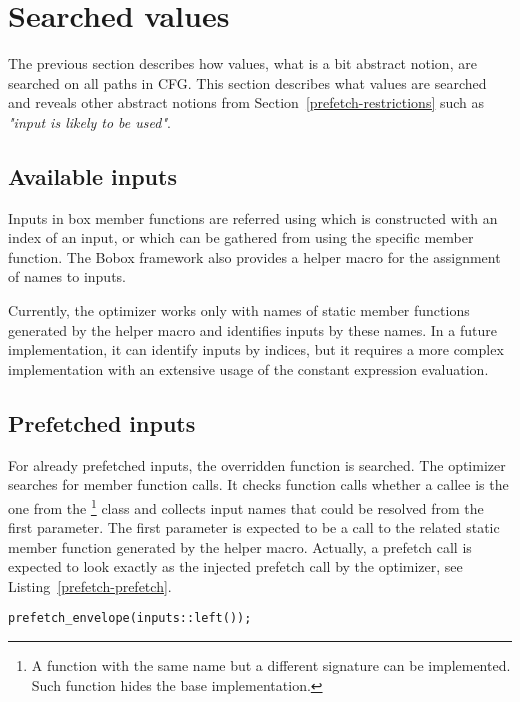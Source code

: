 \section{Searched values}
The previous section describes how values, what is a bit abstract notion, are searched on all paths in CFG. This section describes what values are searched and reveals other abstract notions from Section~\ref{prefetch-restrictions} such as \textit{"input is likely to be used"}.

\subsection{Available inputs}
Inputs in box member functions are referred using  which is constructed with an index of an input, or  which can be gathered from  using the specific  member function. The Bobox framework also provides a helper macro for the assignment of names to inputs.

Currently, the optimizer works only with names of static member functions generated by the helper macro and identifies inputs by these names. In a future implementation, it can identify inputs by indices, but it requires a more complex implementation with an extensive usage of the constant expression evaluation.

\subsection{Prefetched inputs}
For already prefetched inputs, the overridden  function is searched. The optimizer searches for  member function calls. It checks function calls whether a callee is the one from the \footnote{A function with the same name but a different signature can be implemented. Such function hides the base implementation.} class and collects input names that could be resolved from the first parameter. The first parameter is expected to be a call to the related static member function generated by the helper macro. Actually, a prefetch call is expected to look exactly as the injected prefetch call by the optimizer, see Listing~\ref{prefetch-prefetch}.

\begin{lstlisting}[caption={An injected prefetch call for an input called \emph{left}.},label={prefetch-prefetch}, captionpos=b]
prefetch_envelope(inputs::left());
\end{lstlisting}

